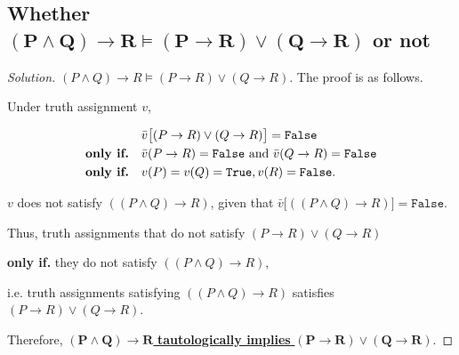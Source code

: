 \documentclass{article}
\newenvironment{solution}{\begin{proof}[\noindent\it Solution]}{\end{proof}}
\begin{document}
\subsection{Whether $\boldsymbol{(P\land Q)\to R\vDash(P\to R)\lor(Q\to R)}$ or not}
\vspace{1em}
\begin{solution}
    $(P\land Q)\to R\vDash(P\to R)\lor(Q\to R)$. The proof is as follows.

    \hspace{2.6em}
    Under truth assignment $v$, 

    \vspace{-2em}
    \begin{align*}
        &\bar{v}\big[(P\to R)\lor(Q\to R)\big]=\mathtt{False} \\
        \text{\textbf{only if.}}\quad &\bar{v}(P\to R)=\mathtt{False}\text{ and }\bar{v}(Q\to R)=\mathtt{False} \\
        \text{\textbf{only if.}}\quad &v(P)=v(Q)=\mathtt{True}, v(R)=\mathtt{False}.
    \end{align*}
    
    \hspace{2.6em}
    $v$ does not satisfy $((P\land Q)\to R)$, given that $\bar{v}\big[((P\land Q)\to R)\big]=\mathtt{False}$.

    \vspace{1em} \hspace{2.6em}
    Thus, truth assignments that do not satisfy $(P\to R)\lor(Q\to R)$ 
    
    \hspace{2.6em}
    \textbf{only if.} they do not satisfy $((P\land Q)\to R)$, 
    
    \hspace{5em}
    i.e. truth assignments satisfying $((P\land Q)\to R)$ satisfies $(P\to R)\lor(Q\to R)$. 

    \vspace{1em} \hspace{2.6em}
    Therefore, \underline{$\boldsymbol{(P\land Q)\to R}$ \textbf{tautologically implies} $\boldsymbol{(P\to R)\lor(Q\to R)}$}.
\end{solution}

\vspace{1em}
\end{document}
